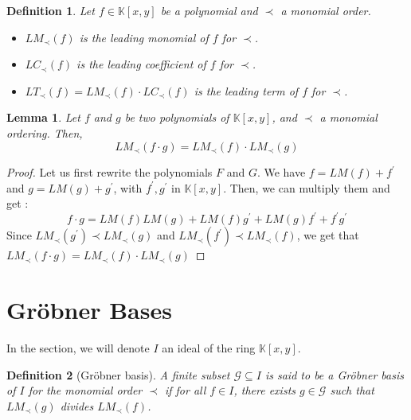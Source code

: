 \documentclass{article}
\newtheorem{lemma}{Lemma}[section]
\newtheorem{definition}{Definition}[section]
\begin{document}
\begin{definition} 
    Let $f \in \mathbb{K}[x, y]$ be a polynomial and $\prec$ a monomial order. 
    \begin{itemize}
        \item $LM_{\prec}(f)$ is the leading monomial of $f$ for $\prec$.
        \item $LC_{\prec}(f)$ is the leading coefficient of $f$ for $\prec$.
        \item $LT_{\prec}(f) = LM_{\prec}(f) \cdot LC_{\prec}(f)$ is the leading term of $f$ for $\prec$.
    \end{itemize}
\end{definition}

\begin{lemma} \label{lemma:lm-mult}
    Let $f$ and $g$ be two polynomials of $\mathbb{K}[x, y]$, and $\prec$ a monomial ordering. Then, 
    \begin{displaymath}
        LM_{\prec}(f \cdot g) = LM_{\prec}(f) \cdot LM_{\prec}(g)
    \end{displaymath}
\end{lemma}

\begin{proof}
    Let us first rewrite the polynomials $F$ and $G$. We have $f = LM(f) + f^{\prime}$ and $g = LM(g) + g^{\prime}$, with $f^{\prime}, g^{\prime}$ in $\mathbb{K}[x, y]$. Then, we can multiply them and get :
    \begin{displaymath}
        f \cdot g = LM(f)LM(g) + LM(f)g^{\prime} + LM(g)f^{\prime} + f^{\prime}g^{\prime}
    \end{displaymath}
    Since $LM_{\prec}(g^{\prime}) \prec LM_{\prec}(g)$ and $LM_{\prec}(f^{\prime}) \prec LM_{\prec}(f)$, we get that $LM_{\prec}(f \cdot g) = LM_{\prec}(f) \cdot LM_{\prec}(g)$ 
\end{proof}

\section{Gröbner Bases}

In the section, we will denote $I$ an ideal of the ring $\mathbb{K}[x, y]$.

\begin{definition}[Gröbner basis]
    A finite subset $\mathscr{G} \subseteq I$ is said to be a Gröbner basis of $I$ for the monomial order $\prec$ if for all $f \in I$, there exists $g \in \mathscr{G}$ such that $LM_{\prec}(g)$ divides $LM_{\prec}(f)$. 
\end{definition}
\end{document}
